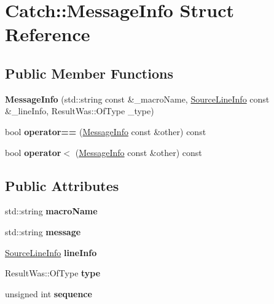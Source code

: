 \hypertarget{struct_catch_1_1_message_info}{}\section{Catch\+:\+:Message\+Info Struct Reference}
\label{struct_catch_1_1_message_info}
\subsection*{Public Member Functions}
\begin{DoxyCompactItemize}
\item 
\mbox{\label{struct_catch_1_1_message_info_a2e336c33ebef7af3c1bbae6a56e14f8a}} 
{\bfseries Message\+Info} (std\+::string const \&\+\_\+macro\+Name, \mbox{\hyperlink{struct_catch_1_1_source_line_info}{Source\+Line\+Info}} const \&\+\_\+line\+Info, Result\+Was\+::\+Of\+Type \+\_\+type)
\item 
\mbox{\label{struct_catch_1_1_message_info_af4b37f2172ba55395813b4bb6bbbde1a}} 
bool {\bfseries operator==} (\mbox{\hyperlink{struct_catch_1_1_message_info}{Message\+Info}} const \&other) const
\item 
\mbox{\label{struct_catch_1_1_message_info_a8254cb8fca2da02a29a9843cdcb79df1}} 
bool {\bfseries operator$<$} (\mbox{\hyperlink{struct_catch_1_1_message_info}{Message\+Info}} const \&other) const
\end{DoxyCompactItemize}
\subsection*{Public Attributes}
\begin{DoxyCompactItemize}
\item 
\mbox{\label{struct_catch_1_1_message_info_a156ade4b3cc731f6ec7b542ae47ba8e3}} 
std\+::string {\bfseries macro\+Name}
\item 
\mbox{\label{struct_catch_1_1_message_info_ab6cd06e050bf426c6577502a5c50e256}} 
std\+::string {\bfseries message}
\item 
\mbox{\label{struct_catch_1_1_message_info_a985165328723e599696ebd8e43195cc5}} 
\mbox{\hyperlink{struct_catch_1_1_source_line_info}{Source\+Line\+Info}} {\bfseries line\+Info}
\item 
\mbox{\label{struct_catch_1_1_message_info_ae928b9117465c696e45951d9d0284e78}} 
Result\+Was\+::\+Of\+Type {\bfseries type}
\item 
\mbox{\label{struct_catch_1_1_message_info_a7f4f57ea21e50160adefce7b68a781d6}} 
unsigned int {\bfseries sequence}
\end{DoxyCompactItemize}
